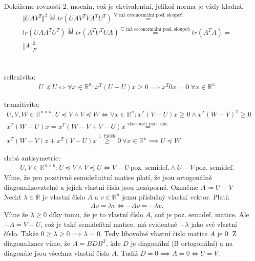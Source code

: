 \documentclass[12pt, a4paper]{article}
\begin{document}
\subsection{}
Dokážeme rovnosti 2. mocnin, což je ekvivalentní, jelikož norma je vždy kladná.
\begin{gather*}
\Vert UAV^T \Vert^2 \stackrel{\text{3.1}}{=} tr(UAV^{T}VA^{T}U^{T}) \stackrel{\text{V má ortonormální posl. sloupců}}{=} \\
tr(UAA^{T}U^{T}) \stackrel{\text{3.1}}{=} tr(A^{T}U^{T}UA) \stackrel{\text{U má ortonormální posl. sloupců}}{=} tr(A^TA) = \\
\Vert A \Vert_{F}^2
\end{gather*}

\section{}
\subsection{}
reflexivita:
\begin{gather*}
U \preceq U \iff \forall x \in \mathbb{R}^n: x^T(U - U)x \geq 0 \implies x^T\mathit{0}x=0  \; \forall x \in \mathbb{R}^n
\end{gather*}

tranzitivita:
\begin{gather*}
U,V,W \in \mathbb{R}^{n \times n}: U \preceq V \land V \preceq W \iff \forall x \in \mathbb{R}^n: x^T(V-U)x \geq 0 \land x^T(W-V)^x \geq 0\\
x^T(W-U)x = x^T(W-V+V-U)x \stackrel{\text{vlastnosti mat. nás.}}{=}\\
x^T(W-V)x + x^T(V-U)x \stackrel{\text{1. řádek}}{\geq} 0\ \forall x \in \mathbb{R}^n \implies U \preceq W
\end{gather*}

slabá antisymetrie:
\begin{gather*}
U,V \in \mathbb{R}^{n \times n}: U \preceq V \land V \preceq U \iff V-U \ \text{poz. semidef.} \land U-V \ \text{poz. semidef.} 
\end{gather*}
Víme, že pro pozitivně semidefinitní matice platí, že jsou ortogonálně diagonalizovatelné a jejich vlastní čísla jsou nezáporná. Označme $A \coloneqq U - V$
Nechť $\lambda \in \mathbb{R}$ je vlastní číslo $A$ a $v \in \mathbb{R}^n$ jemu příslušný vlastní vektor. Platí:
\begin{gather*}
Av=\lambda v \iff -Av = - \lambda v.
\end{gather*}
Víme že $\lambda \geq 0$ díky tomu, že je to vlastní číslo $A$, což je poz. semidef. matice. Ale $-A = V-U$, což je také semidefitní matice, má evidentně $-\lambda$ jako své vlastní číslo. Takže $0 \geq \lambda \geq 0 \implies \lambda = 0$. Tedy libovolné vlastní číslo matice $A$ je 0. Z diagonalizace víme, že $A = BDB^T$, kde $D$ je diagonální (B ortogonální) a na diagonále jsou všechna vlastní čísla $A$. Tudíž $D=0 \implies A=0 \iff U = V$.
\end{document}
